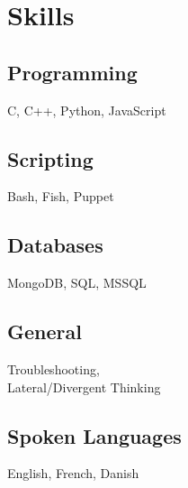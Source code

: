 \section{Skills}
\subsection{Programming}
C, C++, Python,  JavaScript
\sectionsep

\subsection{Scripting}
Bash, Fish, Puppet
\sectionsep

\subsection{Databases}
MongoDB, SQL, MSSQL
\sectionsep

\subsection{General}
Troubleshooting, \\
Lateral/Divergent Thinking

\sectionsep

\subsection{Spoken Languages}
English, French, Danish